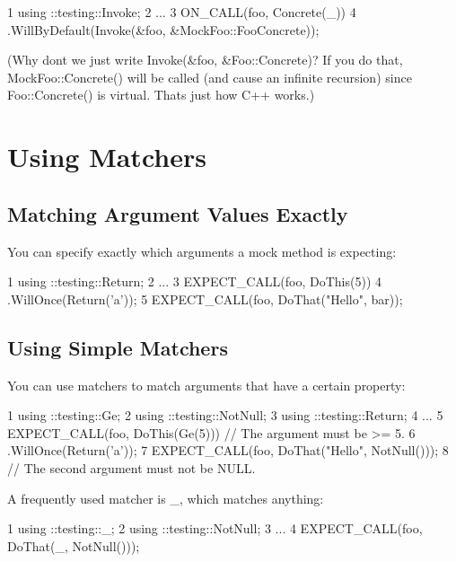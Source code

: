 \begin{DoxyCode}
1 using ::testing::Invoke;
2 ...
3   ON\_CALL(foo, Concrete(\_))
4       .WillByDefault(Invoke(&foo, &MockFoo::FooConcrete));
\end{DoxyCode}


(Why don\textquotesingle{}t we just write {\ttfamily Invoke(\&foo, \&\+Foo\+::\+Concrete)}? If you do that, {\ttfamily Mock\+Foo\+::\+Concrete()} will be called (and cause an infinite recursion) since {\ttfamily Foo\+::\+Concrete()} is virtual. That\textquotesingle{}s just how C++ works.)

\section*{Using Matchers}

\subsection*{Matching Argument Values Exactly}

You can specify exactly which arguments a mock method is expecting\+:


\begin{DoxyCode}
1 using ::testing::Return;
2 ...
3   EXPECT\_CALL(foo, DoThis(5))
4       .WillOnce(Return('a'));
5   EXPECT\_CALL(foo, DoThat("Hello", bar));
\end{DoxyCode}


\subsection*{Using Simple Matchers}

You can use matchers to match arguments that have a certain property\+:


\begin{DoxyCode}
1 using ::testing::Ge;
2 using ::testing::NotNull;
3 using ::testing::Return;
4 ...
5   EXPECT\_CALL(foo, DoThis(Ge(5)))  // The argument must be >= 5.
6       .WillOnce(Return('a'));
7   EXPECT\_CALL(foo, DoThat("Hello", NotNull()));
8   // The second argument must not be NULL.
\end{DoxyCode}


A frequently used matcher is {\ttfamily \+\_\+}, which matches anything\+:


\begin{DoxyCode}
1 using ::testing::\_;
2 using ::testing::NotNull;
3 ...
4   EXPECT\_CALL(foo, DoThat(\_, NotNull()));
\end{DoxyCode}



